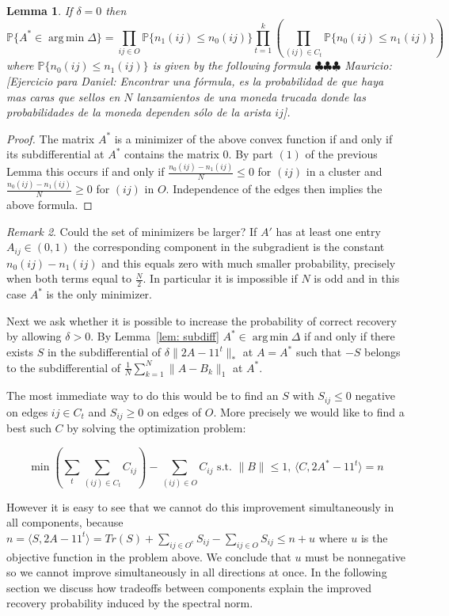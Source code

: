 \documentclass[12pt]{amsart}
\newtheorem{lemma}{Lemma}[section]
\theoremstyle{remark}
\newtheorem{remark}[lemma]{Remark}
\DeclareMathOperator*{\argmin}{arg\,min}
\newcommand{\PP}{\mathbb{P}}
\newcommand{\mv}[1]{{\color{red} \sf $\clubsuit\clubsuit\clubsuit$ Mauricio: [#1]}}
\begin{document}
\begin{lemma} If $\delta=0$ then 
\[\PP\{A^*\in\argmin\Delta \} =\prod_{ij\in O} \PP\{n_1(ij)\leq n_0(ij)\} \prod_{t=1}^k \left(\prod_{(ij)\in C_t}\PP\{n_0(ij)\leq n_1(ij)\}\right)\]
where $\PP\{n_0(ij)\leq n_1(ij)\}$ is given by the following formula 
\mv{Ejercicio para Daniel: Encontrar una f\'ormula, es la probabilidad de que haya mas caras que sellos en $N$ lanzamientos de una moneda trucada donde las probabilidades de la moneda dependen s\'olo de la arista $ij$}.
\end{lemma}
\begin{proof} The matrix $A^*$ is a minimizer of the above convex function if and only if its subdifferential at $A^*$ contains the matrix $0$. By part $(1)$ of the previous Lemma this occurs if and only if $\frac{n_0(ij)-n_1(ij)}{N}\leq 0$ for $(ij)$ in a cluster and 
$\frac{n_0(ij)-n_1(ij)}{N}\geq 0$ for $(ij)$ in $O$. Independence of the edges then implies the above formula.  
\end{proof}
\begin{remark} Could the set of minimizers be larger? If $A'$ has at least one entry $A_{ij}\in (0,1)$ the corresponding component in the subgradient is the constant $n_0(ij)-n_1(ij)$ and this equals zero with much smaller probability, precisely when both terms equal to $\frac{N}{2}$. In particular it is impossible if $N$ is odd and in this case $A^*$ is the only minimizer.
\end{remark}

Next we ask whether it is possible to increase the probability of correct recovery by allowing $\delta>0$. By Lemma~\ref{lem: subdiff} $A^*\in \argmin \Delta$ if and only if there exists $S$ in the subdifferential of $\delta\|2A-11^t\|_*$ at $A=A^*$ such that $-S$ belongs to the subdifferential of $\frac{1}{N}\sum_{k=1}^N\|A-B_k\|_1$ at $A^*$. 

The most immediate way to do this would be to find an $S$ with $S_{ij}\leq 0$ negative on edges $ij\in C_t$ and $S_{ij}\geq 0$ on edges of $O$. More precisely we would like to find a best such $C$ by solving the optimization problem:

\[
\min \left(\sum_{t}\sum_{(ij)\in C_t} C_{ij}\right)-\sum_{(ij)\in O} C_{ij} \text{ s.t. $\|B\|\leq 1$, $\langle C, 2A^*-11^t\rangle = n$} 
\]

However it is easy to see that we cannot do this improvement simultaneously in all components, because $n=\langle S, 2A-11^t\rangle = Tr(S)+\sum_{ij \in O^c} S_{ij} -\sum_{ij \in O} S_{ij}\leq n+u$ where $u$ is the objective function in the problem above. We conclude that $u$ must be nonnegative so we cannot improve simultaneously in all directions at once.
In the following section we discuss how tradeoffs between components explain the improved recovery probability induced by the spectral norm.
\end{document}
